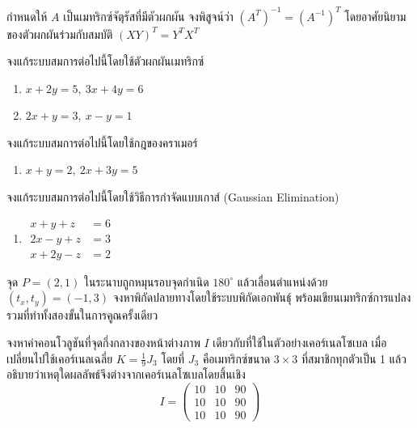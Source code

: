 \begin{exercise}
กำหนดให้ $A$ เป็นเมทริกซ์จัตุรัสที่มีตัวผกผัน จงพิสูจน์ว่า $(A^T)^{-1} = (A^{-1})^T$ โดยอาศัยนิยามของตัวผกผันร่วมกับสมบัติ $(XY)^T = Y^T X^T$
\end{exercise}

\begin{exercise}
จงแก้ระบบสมการต่อไปนี้โดยใช้ตัวผกผันเมทริกซ์
\begin{enumerate}
    \item $x + 2y = 5,\ 3x + 4y = 6$
    \item $2x + y = 3,\ x - y = 1$
\end{enumerate}
\end{exercise}

\begin{exercise}
จงแก้ระบบสมการต่อไปนี้โดยใช้กฎของคราเมอร์
\begin{enumerate}
    \item $x + y = 2,\ 2x + 3y = 5$
\end{enumerate}
\end{exercise}

\begin{exercise}
จงแก้ระบบสมการต่อไปนี้โดยใช้วิธีการกำจัดแบบเกาส์ (Gaussian Elimination)
\begin{enumerate}
    \item $\begin{aligned} x + y + z &= 6 \\ 2x - y + z &= 3 \\ x + 2y - z &= 2 \end{aligned}$
\end{enumerate}
\end{exercise}

\begin{exercise}
จุด $P = (2, 1)$ ในระนาบถูกหมุนรอบจุดกำเนิด $180^\circ$ แล้วเลื่อนตำแหน่งด้วย $(t_x, t_y) = (-1, 3)$ จงหาพิกัดปลายทางโดยใช้ระบบพิกัดเอกพันธุ์ พร้อมเขียนเมทริกซ์การแปลงรวมที่ทำทั้งสองขั้นในการคูณครั้งเดียว
\end{exercise}

\begin{exercise}
จงหาค่าคอนโวลูชันที่จุดกึ่งกลางของหน้าต่างภาพ $I$ เดียวกับที่ใช้ในตัวอย่างเคอร์เนลโซเบล เมื่อเปลี่ยนไปใช้เคอร์เนลเฉลี่ย $K = \tfrac{1}{9}J_3$ โดยที่ $J_3$ คือเมทริกซ์ขนาด $3 \times 3$ ที่สมาชิกทุกตัวเป็น 1 แล้วอธิบายว่าเหตุใดผลลัพธ์จึงต่างจากเคอร์เนลโซเบลโดยสิ้นเชิง
\[ I = \begin{pmatrix} 10 & 10 & 90 \\ 10 & 10 & 90 \\ 10 & 10 & 90 \end{pmatrix} \]
\end{exercise}

